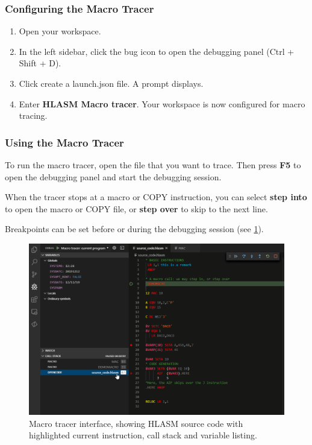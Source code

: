 \subsubsection{Configuring the Macro Tracer}

\begin{enumerate}
	\item Open your workspace.
	\item In the left sidebar, click the bug icon to open the debugging panel (Ctrl + Shift + D).
	\item Click create a launch.json file. A  prompt displays.
	\item Enter \textbf{HLASM Macro tracer}. Your workspace is now configured for macro tracing.
\end{enumerate}

\subsubsection{Using the Macro Tracer}

To run the macro tracer, open the file that you want to trace. Then press \textbf{F5} to open the debugging panel and start the debugging session.

When the tracer stops at a macro or COPY instruction, you can select \textbf{step into} to open the macro or COPY file, or \textbf{step over} to skip to the next line.

Breakpoints can be set before or during the debugging session (see \cref{fig:trac}).

\begin{figure}[p]
	\centering
	\includegraphics[width=0.9\linewidth]{img/tracer/tracer-175}
	\caption{Macro tracer interface, showing HLASM source code with highlighted current instruction, call stack and variable listing.}
	\label{fig:trac}
\end{figure}
